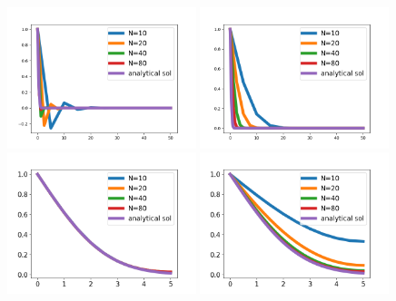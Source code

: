 \begin{figure}	
\includegraphics[width=0.49\textwidth]{./chapters/chp6/FIG/Amyloid_numerical_1D_L_max50_dt300_final1800_lumpednot.png}
\includegraphics[width=0.49\textwidth]{./chapters/chp6/FIG/Amyloid_numerical_1D_L_max50_dt300_final1800_lumpedlumped.png} \\
\includegraphics[width=0.49\textwidth]{./chapters/chp6/FIG/Amyloid_numerical_1D_L_max5_dt300_final32400_lumpednot.png}
\includegraphics[width=0.49\textwidth]{./chapters/chp6/FIG/Amyloid_numerical_1D_L_max5_dt300_final32400_lumpedlumped.png}
\caption{
}
\end{figure}
